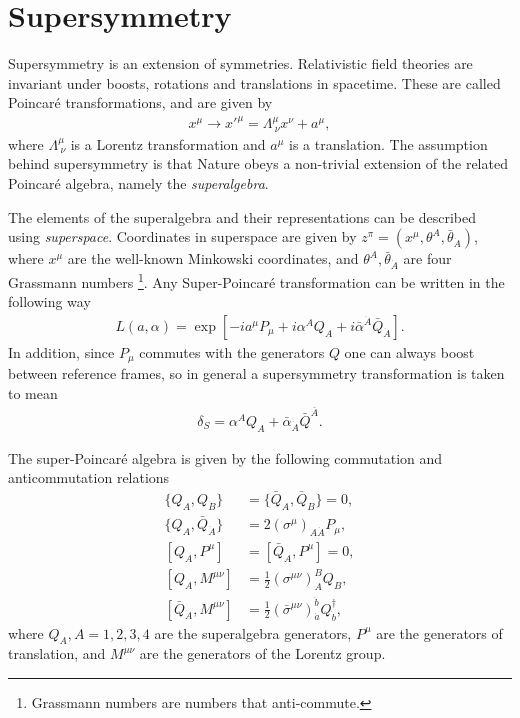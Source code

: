 \documentclass[twoside,english]{uiofysmaster}
\begin{document}
\section{Supersymmetry}

Supersymmetry is an extension of symmetries. Relativistic field theories are invariant under boosts, rotations and translations in spacetime. These are called Poincar\'{e} transformations, and are given by
\begin{align}
x^{\mu} \rightarrow x'^{\mu} = \Lambda^{\mu}_{\ \nu} x^{\nu} + a^{\mu}, 
\end{align}
where $\Lambda^{\mu}_{\ \nu}$ is a Lorentz transformation and $a^{\mu}$ is a translation. The assumption behind supersymmetry is that Nature obeys a non-trivial extension of the related Poincar\'{e} algebra, namely the \textit{superalgebra}. 

The elements of the superalgebra and their representations can be described using \textit{superspace}. Coordinates in superspace are given by $z^{\pi} = (x^{\mu}, \theta^A, \bar{\theta}_{\dot{A}})$, where $x^{\mu}$ are the well-known Minkowski coordinates, and $\theta^A, \bar{\theta}_{\dot{A}}$ are four Grassmann numbers \footnote{Grassmann numbers are numbers that anti-commute.}. Any Super-Poincar\'{e} transformation can be written in the following way
\begin{align}
L(a, \alpha) = \exp [-i a^{\mu} P_{\mu} + i \alpha^A Q_A + i \bar{\alpha}^{\dot{A}} \bar{Q}_{\dot{A}} ].
\end{align}
In addition, since $P_{\mu}$ commutes with the generators $Q$ one can always boost between reference frames, so in general a supersymmetry transformation is taken to mean
\begin{align}
\delta_S = \alpha^A Q_A + \bar{\alpha}_{\dot{A}} \bar{Q}^{\bar{A}}.
\end{align}


The super-Poincar\'{e} algebra is given by the following commutation and anticommutation relations \cite{kvellestad2015chasing}
\begin{align}
\{Q_A, Q_B \} &= \{ \bar{Q}_A, \bar{Q}_B\} = 0,\\
\{Q_A, \bar{Q}_{\dot{A}} \} &= 2 (\sigma^{\mu})_{A \dot{A}} P_{\mu},\\
[Q_A, P^{\mu}] &= [\bar{Q}_A, P^{\mu}] = 0,\label{Eq:: [Q,P]}\\
[Q_A, M^{\mu \nu}] &= \frac{1}{2} (\sigma^{\mu \nu})_A^B Q_B,\\
[\bar{Q}_{\dot{A}}, M^{\mu \nu}] &= \frac{1}{2} (\bar{\sigma}^{\mu \nu})_{\dot{a}}^{\dot{b}} Q_{\dot{b}}^{\dagger},  
\end{align}
where $Q_A, A=1,2,3,4$ are the superalgebra generators, $P^{\mu}$ are the generators of translation, and $M^{\mu \nu}$ are the generators of the Lorentz group. 
\end{document}
